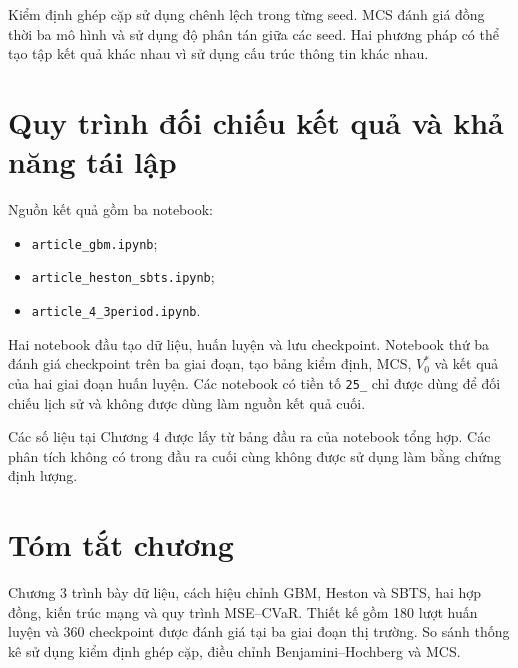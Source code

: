Kiểm định ghép cặp sử dụng chênh lệch trong từng seed. MCS đánh giá đồng thời
ba mô hình và sử dụng độ phân tán giữa các seed. Hai phương pháp có thể tạo tập
kết quả khác nhau vì sử dụng cấu trúc thông tin khác nhau.

\section{Quy trình đối chiếu kết quả và khả năng tái lập}
\label{sec:c3-reproducibility}

Nguồn kết quả gồm ba notebook:
\begin{itemize}
    \item \texttt{article\_gbm.ipynb};
    \item \texttt{article\_heston\_sbts.ipynb};
    \item \texttt{article\_4\_3period.ipynb}.
\end{itemize}
Hai notebook đầu tạo dữ liệu, huấn luyện và lưu checkpoint. Notebook thứ ba
đánh giá checkpoint trên ba giai đoạn, tạo bảng kiểm định, MCS, $V_0^{*}$ và
kết quả của hai giai đoạn huấn luyện. Các notebook có tiền tố \texttt{25\_}
chỉ được dùng để đối chiếu lịch sử và không được dùng làm nguồn kết quả cuối.

Các số liệu tại Chương 4 được lấy từ bảng đầu ra của notebook tổng hợp. Các
phân tích không có trong đầu ra cuối cùng không được sử dụng làm bằng chứng
định lượng.

\section{Tóm tắt chương}

Chương 3 trình bày dữ liệu, cách hiệu chỉnh GBM, Heston và SBTS, hai hợp đồng,
kiến trúc mạng và quy trình MSE--CVaR. Thiết kế gồm 180 lượt huấn luyện và 360
checkpoint được đánh giá tại ba giai đoạn thị trường. So sánh thống kê sử dụng
kiểm định ghép cặp, điều chỉnh Benjamini--Hochberg và MCS.
